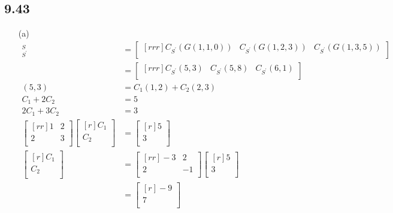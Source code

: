 \documentclass{report}
\theoremstyle{plain}
\theoremstyle{definition}
\theoremstyle{plain}
\begin{document}
\subsection{9.43}
\begin{enumerate}
\item[(a)]
\begin{align*}
[G]_{S^\prime}^S&=\begin{bmatrix}[rrr]C_{S^\prime}(G(1,1,0)) & C_{S^\prime}(G(1,2,3)) & C_{S^\prime}(G(1,3,5))\\\end{bmatrix}\\
&= \begin{bmatrix}[rrr]C_{S^\prime}(5,3) & C_{S^\prime}(5,8) & C_{S^\prime}(6,1)\\\end{bmatrix}\\
(5,3)&=C_1(1,2)+C_2(2,3)\\
C_1+2C_2&=5\\
2C_1+3C_2&=3\\
\begin{bmatrix}[rr]1&2\\2&3\\\end{bmatrix}\begin{bmatrix}[r]C_1\\C_2\\\end{bmatrix}&=\begin{bmatrix}[r]5\\3\\\end{bmatrix}\\
\begin{bmatrix}[r]C_1\\C_2\\\end{bmatrix}&=\begin{bmatrix}[rr]-3&2\\2&-1\\\end{bmatrix}\begin{bmatrix}[r]5\\3\\\end{bmatrix}\\
&= \begin{bmatrix}[r]-9\\7\\\end{bmatrix}\\

\end{align*}
\end{enumerate}
\end{document}
